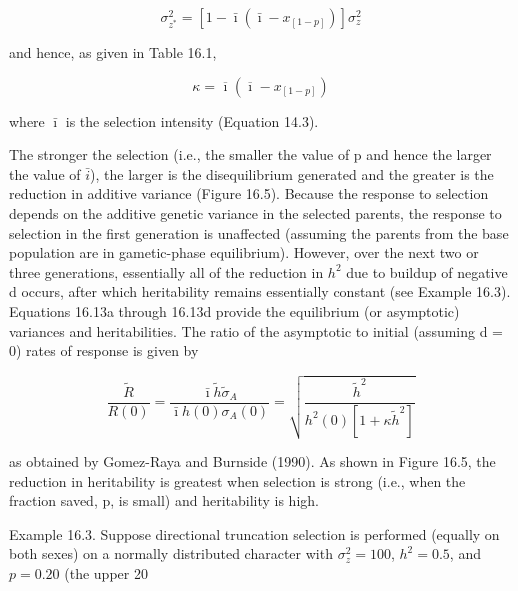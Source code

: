 \documentclass{article}
\begin{document}
\begin{equation}
\sigma_{z^{*}}^{2}=\left[1-\bar{\imath}\left(\bar{\imath}-x_{[1-p]}\right)\right]\sigma_{z}^{2}
\tag{16.15a}
\label{eq:16_15a}
\end{equation}

and hence, as given in Table 16.1,

\begin{equation}
\kappa=\overline{\imath}\left(\overline{\imath}-x_{[1-p]}\right)
\tag{16.15b}
\label{eq:16_15b}
\end{equation}

where  $ \bar{\imath} $ is the selection intensity (Equation 14.3).

The stronger the selection (i.e., the smaller the value of p and hence the larger the value of  $ \bar{i} $), the larger is the disequilibrium generated and the greater is the reduction in additive variance (Figure 16.5). Because the response to selection depends on the additive genetic variance in the selected parents, the response to selection in the first generation is unaffected (assuming the parents from the base population are in gametic-phase equilibrium). However, over the next two or three generations, essentially all of the reduction in  $ h^{2} $ due to buildup of negative d occurs, after which heritability remains essentially constant (see Example 16.3). Equations 16.13a through 16.13d provide the equilibrium (or asymptotic) variances and heritabilities. The ratio of the asymptotic to initial (assuming d = 0) rates of response is given by

\begin{equation}
\frac{\widetilde{R}}{R(0)}=\frac{\bar{\imath}\widetilde{h}\widetilde{\sigma}_{A}}{\bar{\imath}h(0)\sigma_{A}(0)}=\sqrt{\frac{\widetilde{h}^{2}}{h^{2}(0)\left[1+\kappa\widetilde{h}^{2}\right]}}
\tag{16.16}
\label{eq:16_16}
\end{equation}

as obtained by Gomez-Raya and Burnside (1990). As shown in Figure 16.5, the reduction in heritability is greatest when selection is strong (i.e., when the fraction saved, p, is small) and heritability is high.

Example 16.3. Suppose directional truncation selection is performed (equally on both sexes) on a normally distributed character with  $ \sigma_z^2 = 100 $,  $ h^2 = 0.5 $, and  $ p = 0.20 $ (the upper 20%
\end{document}
